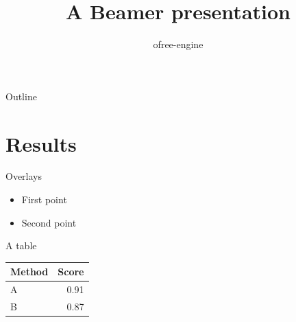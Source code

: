 \documentclass{beamer}
\title{A Beamer presentation}
\author{ofree-engine}
\begin{document}
\begin{frame}
  \titlepage
\end{frame}

\begin{frame}{Outline}
  \tableofcontents
\end{frame}

\section{Results}
\begin{frame}{Overlays}
  \begin{itemize}
    \item<1-> First point
    \item<2-> Second point
  \end{itemize}
  \pause
\end{frame}

\begin{frame}{A table}
  \centering
  \begin{tabular}{lr}
    \toprule Method & Score \\ \midrule A & 0.91 \\ B & 0.87 \\ \bottomrule
  \end{tabular}
\end{frame}
\end{document}

